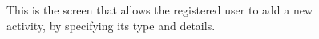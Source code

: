 \documentclass[12pt,titlepage]{article}
\begin{document}
\begin{figure}
\centering
{}
\caption{This is the screen that allows the registered user to add a new activity, by specifying its type and details.}
\end{figure}
\clearpage
\newpage
\end{document}
